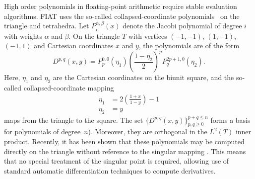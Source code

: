 High order polynomials in floating-point arithmetic require stable
evaluation algorithms.  FIAT uses the so-called collapsed-coordinate
polynomials~\citep{KarniadakisSherwin2005} on the triangle and tetrahedra.  Let
\(P^{\alpha,\beta}_i(x) \) denote the Jacobi polynomial of degree \( i
\) with weights \( \alpha \) and \( \beta \).  On the triangle \( T \)
with vertices \( (-1,-1) \), \((1,-1) \), \( (-1,1) \) and Cartesian
coordinates \( x\) and \( y \), the polynomials are of the form
\begin{equation}
  D^{p,q}( x,y ) = P^{0,0}_{p}(\eta_1)  \left( \frac{1-\eta_2}{2}
  \right)^p P^{2p+1,0}_q(\eta_2).
\end{equation}
Here, $\eta_1$ and $\eta_2$ are the Cartesian coordinates on
the biunit square, and the so-called collapsed-coordinate mapping
\[
\begin{split}
\eta_1 & = 2\left( \frac{1+x}{1-y} \right) - 1
\\
\eta_2 & = y
\end{split}
\]
maps from the triangle to the square.  The set $\{ D^{p,q}(x, y)
\}_{p,q \geqslant 0}^{p+q\leqslant n}$ forms a basis for polynomials
of degree~$n$).  Moreover, they are orthogonal in the $L^2(T)$ inner
product.  Recently, it has been shown that these polynomials may be
computed directly on the triangle without reference to the singular
mapping \citep{Kirby2009}.  This means that no special treatment of
the singular point is required, allowing use of standard automatic
differentiation techniques to compute derivatives.

